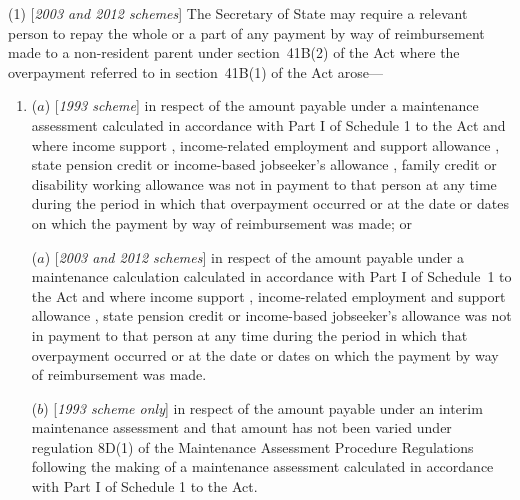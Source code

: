 \documentclass[12pt,a4paper]{article}
\begin{document}
(1) [\emph{2003 and 2012 schemes}] The Secretary of State may require a relevant person to repay the whole or a part of any payment by way of reimbursement made to 
a non-resident parent  %
under section~41B(2) of the Act where the overpayment referred to in section~41B(1) of the Act arose—
\begin{enumerate}\item[]
($a$) [\emph{1993 scheme}] in respect of the amount payable under a maintenance assessment calculated in accordance with Part I of Schedule 1 to the Act and where income support%
, income-related employment and support allowance%
, state pension credit  %
or income-based jobseeker’s allowance%
, family credit or disability working allowance  %
was not in payment to that person at any time during the period in which that overpayment occurred or at the date or dates on which the payment by way of reimbursement was made; or

($a$) [\emph{2003 and 2012 schemes}] in respect of the amount payable under a maintenance 
calculation  %
calculated in accordance with Part I of Schedule~1 to the Act and where income support%
, income-related employment and support allowance%
, state pension credit  %
or income-based jobseeker’s allowance  %
was not in payment to that person at any time during the period in which that overpayment occurred or at the date or dates on which the payment by way of reimbursement was made.

($b$) [\emph{1993 scheme only}] in respect of the amount payable under an interim maintenance assessment and that amount has not been varied under regulation 8D(1) of the Maintenance Assessment Procedure Regulations following the making of a maintenance assessment calculated in accordance with Part I of Schedule 1 to the Act.
\end{enumerate}
\end{document}
